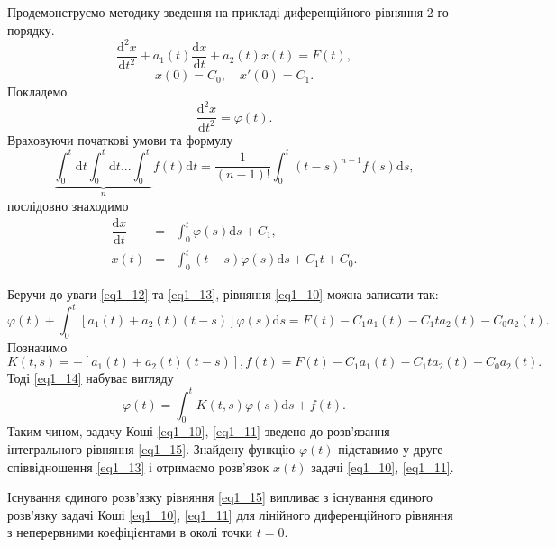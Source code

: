 \documentclass[14pt,twoside]{extreport}
\theoremstyle{mystyle}
\numberwithin{equation}{chapter}
\begin{document}
Продемонструємо методику зведення на прикладі диференційного рівняння 2-го порядку.
\begin{equation} \label{eq1_10}
\frac{\mathrm{d}^{2} x}{\mathrm{d}t^{2}} +a_{1} (t)\frac{\mathrm{d}x}{\mathrm{d}t} +a_{2} (t)x(t)=F(t),
\end{equation}
\begin{equation} \label{eq1_11}
x(0)=C_{0} ,\quad x'(0)=C_{1} .
\end{equation}
Покладемо
\begin{equation} \label{eq1_12}
\frac{\mathrm{d}^{2} x}{\mathrm{d}t^{2}} =\varphi (t).
\end{equation}
Враховуючи початкові умови та формулу
\begin{equation}\label{multintegration}
\underbrace{\int _{0}^{t} \mathrm{d}t\int _{0}^{t} \mathrm{d}t...\int _{0}^{t} } _{n} f(t)\mathrm{d}t=\frac{1}{(n-1)!} \int _{0}^{t} (t-s)^{n-1} f(s)\mathrm{d}s,
\end{equation}
послідовно знаходимо
\begin{equation}\label{eq1_13}
\begin{array}{lll}
\dfrac{\mathrm{d}x}{\mathrm{d}t} &=& \displaystyle\int _{0}^{t} \varphi (s)\mathrm{d}s+C_{1},\\
x(t) &=& \displaystyle \int _{0}^{t} (t-s)\varphi (s)\mathrm{d}s+C_{1} t+C_{0}.
\end{array}
\end{equation}

Беручи до уваги \eqref{eq1_12} та \eqref{eq1_13}, рівняння \eqref{eq1_10} можна записати так:
\begin{equation} \label{eq1_14}
\varphi (t)+\int _{0}^{t} [a_{1} (t)+a_{2} (t)(t-s)]\varphi (s)\mathrm{d}s=F(t)-C_{1} a_{1} (t)-C_{1} ta_{2} (t)-C_{0} a_{2} (t).
\end{equation}
Позначимо
\[K(t, s)=-[a_{1} (t)+a_{2} (t)(t-s)], f(t)=F(t)-C_{1} a_{1} (t)-C_{1} ta_{2} (t)-C_{0} a_{2} (t).\]
Тоді \eqref{eq1_14} набуває вигляду
\begin{equation} \label{eq1_15}
\varphi (t)=\int _{0}^{t} K(t, s)\varphi (s)\mathrm{d}s+f(t).
\end{equation}
Таким чином, задачу Коші \eqref{eq1_10}, \eqref{eq1_11} зведено до розв'язання інтегрального рівняння \eqref{eq1_15}. Знайдену функцію $\varphi (t)$ підставимо у друге співвідношення \eqref{eq1_13} і отримаємо розв'язок $x(t)$ задачі \eqref{eq1_10}, \eqref{eq1_11}.

Існування єдиного розв'язку рівняння \eqref{eq1_15} випливає з існування єдиного розв'язку задачі Коші \eqref{eq1_10}, \eqref{eq1_11} для лінійного диференційного рівняння з неперервними коефіцієнтами в околі точки $t=0$.
\end{document}

